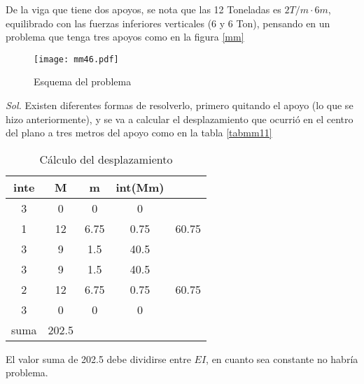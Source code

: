 \begin{example}
  De la viga que tiene dos apoyos, se nota que las 12 Toneladas es $2T/m\cdot 6m$, equilibrado con las fuerzas inferiores verticales (6 y 6 Ton), pensando en un problema que tenga tres apoyos como en la figura \ref{mm}
\begin{figure}[h!]
\centering
\texttt{[image: mm46.pdf]}
\caption{Esquema del problema}
\label{mm46}
\end{figure}
\end{example}
\textit{ Sol. }
Existen diferentes formas de resolverlo, primero quitando el apoyo (lo que se hizo anteriormente), y se va a calcular el desplazamiento que ocurrió en el centro del plano a tres metros del apoyo como en la tabla \ref{tabmm11}
\begin{table}[h!]\centering
  \begin{tabular}{@{}ccccc@{}}
  \toprule
  inte & M     & m    & int(Mm) &       \\ \midrule
  3    & 0     & 0    & 0       &       \\
  1    & 12    & 6.75 & 0.75    & 60.75 \\
  3    & 9     & 1.5  & 40.5    &       \\
  3    & 9     & 1.5  & 40.5    &       \\
  2    & 12    & 6.75 & 0.75    & 60.75 \\
  3    & 0     & 0    & 0       &       \\
  suma & 202.5 &      &         &       \\ \bottomrule
  \end{tabular}
  \caption{Cálculo del desplazamiento}
  \label{tabmm111}
\end{table}
El valor suma de 202.5 debe dividirse entre $EI$, en cuanto sea constante no habría problema.


